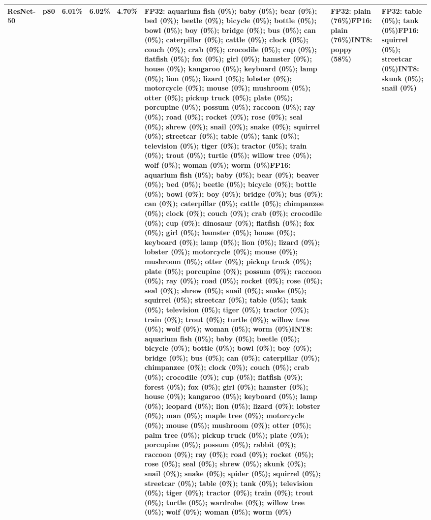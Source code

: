 \begin{longtable}{p{2.8cm} r r r r p{5.0cm} p{4.2cm} p{4.2cm}}
ResNet-50 & p80 & 6.01\% & 6.02\% & 4.70\% & FP32: aquarium fish (0\%); baby (0\%); bear (0\%); bed (0\%); beetle (0\%); bicycle (0\%); bottle (0\%); bowl (0\%); boy (0\%); bridge (0\%); bus (0\%); can (0\%); caterpillar (0\%); cattle (0\%); clock (0\%); couch (0\%); crab (0\%); crocodile (0\%); cup (0\%); flatfish (0\%); fox (0\%); girl (0\%); hamster (0\%); house (0\%); kangaroo (0\%); keyboard (0\%); lamp (0\%); lion (0\%); lizard (0\%); lobster (0\%); motorcycle (0\%); mouse (0\%); mushroom (0\%); otter (0\%); pickup truck (0\%); plate (0\%); porcupine (0\%); possum (0\%); raccoon (0\%); ray (0\%); road (0\%); rocket (0\%); rose (0\%); seal (0\%); shrew (0\%); snail (0\%); snake (0\%); squirrel (0\%); streetcar (0\%); table (0\%); tank (0\%); television (0\%); tiger (0\%); tractor (0\%); train (0\%); trout (0\%); turtle (0\%); willow tree (0\%); wolf (0\%); woman (0\%); worm (0\%)\newline FP16: aquarium fish (0\%); baby (0\%); bear (0\%); beaver (0\%); bed (0\%); beetle (0\%); bicycle (0\%); bottle (0\%); bowl (0\%); boy (0\%); bridge (0\%); bus (0\%); can (0\%); caterpillar (0\%); cattle (0\%); chimpanzee (0\%); clock (0\%); couch (0\%); crab (0\%); crocodile (0\%); cup (0\%); dinosaur (0\%); flatfish (0\%); fox (0\%); girl (0\%); hamster (0\%); house (0\%); keyboard (0\%); lamp (0\%); lion (0\%); lizard (0\%); lobster (0\%); motorcycle (0\%); mouse (0\%); mushroom (0\%); otter (0\%); pickup truck (0\%); plate (0\%); porcupine (0\%); possum (0\%); raccoon (0\%); ray (0\%); road (0\%); rocket (0\%); rose (0\%); seal (0\%); shrew (0\%); snail (0\%); snake (0\%); squirrel (0\%); streetcar (0\%); table (0\%); tank (0\%); television (0\%); tiger (0\%); tractor (0\%); train (0\%); trout (0\%); turtle (0\%); willow tree (0\%); wolf (0\%); woman (0\%); worm (0\%)\newline INT8: aquarium fish (0\%); baby (0\%); beetle (0\%); bicycle (0\%); bottle (0\%); bowl (0\%); boy (0\%); bridge (0\%); bus (0\%); can (0\%); caterpillar (0\%); chimpanzee (0\%); clock (0\%); couch (0\%); crab (0\%); crocodile (0\%); cup (0\%); flatfish (0\%); forest (0\%); fox (0\%); girl (0\%); hamster (0\%); house (0\%); kangaroo (0\%); keyboard (0\%); lamp (0\%); leopard (0\%); lion (0\%); lizard (0\%); lobster (0\%); man (0\%); maple tree (0\%); motorcycle (0\%); mouse (0\%); mushroom (0\%); otter (0\%); palm tree (0\%); pickup truck (0\%); plate (0\%); porcupine (0\%); possum (0\%); rabbit (0\%); raccoon (0\%); ray (0\%); road (0\%); rocket (0\%); rose (0\%); seal (0\%); shrew (0\%); skunk (0\%); snail (0\%); snake (0\%); spider (0\%); squirrel (0\%); streetcar (0\%); table (0\%); tank (0\%); television (0\%); tiger (0\%); tractor (0\%); train (0\%); trout (0\%); turtle (0\%); wardrobe (0\%); willow tree (0\%); wolf (0\%); woman (0\%); worm (0\%) & FP32: plain (76\%)\newline FP16: plain (76\%)\newline INT8: poppy (58\%) & FP32: table (0\%); tank (0\%)\newline FP16: squirrel (0\%); streetcar (0\%)\newline INT8: skunk (0\%); snail (0\%) \\ \hline

\end{longtable}
